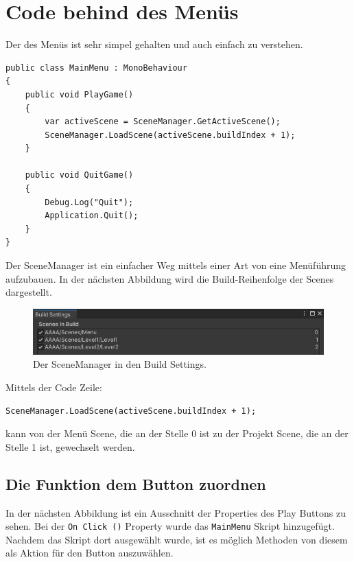 \section{Code behind des Menüs}

Der  des Menüs ist sehr simpel gehalten und auch einfach zu verstehen.

\begin{lstlisting}[language=CSharp,caption={Main Menu Klasse.},label=code:mainmenu]
public class MainMenu : MonoBehaviour
{
    public void PlayGame()
    {
        var activeScene = SceneManager.GetActiveScene();
        SceneManager.LoadScene(activeScene.buildIndex + 1);
    }

    public void QuitGame()
    {
        Debug.Log("Quit");
        Application.Quit();
    }
}
\end{lstlisting}
Der SceneManager ist ein einfacher Weg mittels einer Art von  eine Menüführung aufzubauen. In der nächsten Abbildung wird die Build-Reihenfolge der Scenes dargestellt.

\begin{center}
    \begin{figure}[h]
        \centering
        \includegraphics*[width=1\textwidth]{chapters/03/images/SceneManager.png}
        \caption{Der SceneManager in den Build Settings.}
        \label{htl04}
    \end{figure}
\end{center}

\noindent
Mittels der Code Zeile: 
\begin{lstlisting}[language=CSharp]
    SceneManager.LoadScene(activeScene.buildIndex + 1);
\end{lstlisting}
kann von der Menü Scene, die an der Stelle 0 ist zu der Projekt Scene, die an der Stelle 1 ist, gewechselt werden.

\pagebreak

\subsection{Die Funktion dem Button zuordnen}

In der nächsten Abbildung ist ein Ausschnitt der Properties des Play Buttons zu sehen. Bei der \verb+On Click ()+ Property wurde das \verb+MainMenu+ Skript hinzugefügt. Nachdem das Skript dort ausgewählt wurde, ist es möglich Methoden von diesem als Aktion für den Button auszuwählen. 


